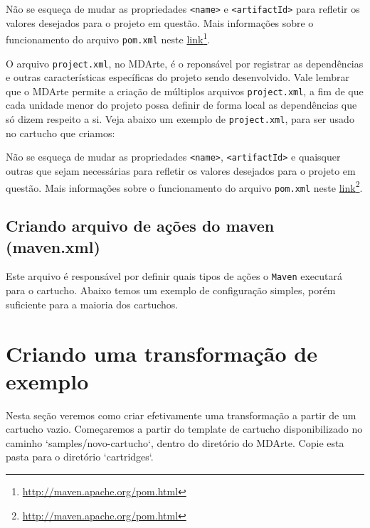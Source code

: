 

Não se esqueça de mudar as propriedades \texttt{<name>} e \texttt{<artifactId>}
para refletir os valores desejados para o projeto em questão. Mais informações
sobre o funcionamento do arquivo \texttt{pom.xml} neste
\href{http://maven.apache.org/pom.html}{link}\footnote{\href{http://maven.apache.org/pom.html}{http://maven.apache.org/pom.html}}.

O arquivo \texttt{project.xml}, no MDArte, é o reponsável por registrar
as dependências e outras características específicas do projeto sendo
desenvolvido. Vale lembrar que o MDArte permite a criação de múltiplos arquivos
\texttt{project.xml}, a fim de que cada unidade menor do projeto possa definir
de forma local as dependências que só dizem respeito a si. Veja abaixo um
exemplo de \texttt{project.xml}, para ser usado no cartucho que criamos:



Não se esqueça de mudar as propriedades \texttt{<name>}, \texttt{<artifactId>} e
quaisquer outras que sejam necessárias para refletir os valores desejados
para o projeto em questão. Mais informações sobre o funcionamento do arquivo
\texttt{pom.xml} neste
\href{http://maven.apache.org/pom.html}{link}\footnote{\href{http://maven.apache.org/pom.html}{http://maven.apache.org/pom.html}}.

\subsection{Criando arquivo de ações do maven (maven.xml)}
Este arquivo é responsável por definir quais tipos de ações o \texttt{Maven}
executará para o cartucho. Abaixo temos um exemplo de configuração simples,
porém suficiente para a maioria dos cartuchos.



\section{Criando uma transformação de exemplo}
Nesta seção veremos como criar efetivamente uma transformação a partir de um
cartucho vazio. Começaremos a partir do template de cartucho disponibilizado
no caminho `samples/novo-cartucho`, dentro do diretório do MDArte. Copie esta
pasta para o diretório `cartridges`.

